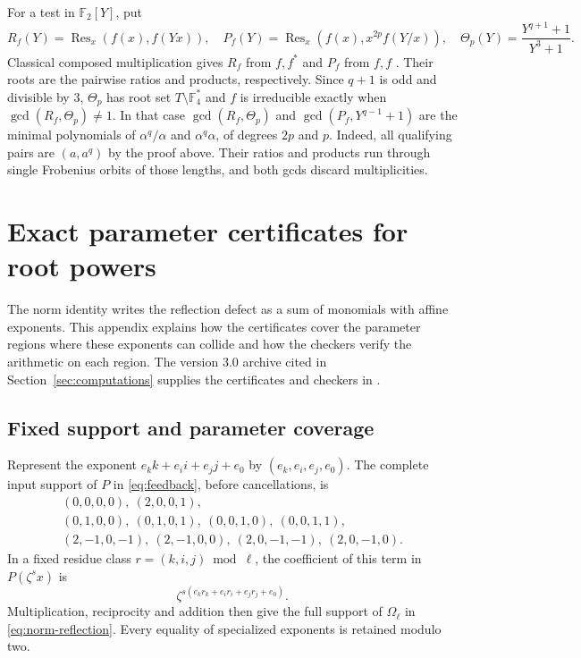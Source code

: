 \documentclass[11pt]{article}
\theoremstyle{definition}
\theoremstyle{remark}
\begin{document}
For a test in $\mathbb F_2[Y]$, put
\[
 R_f(Y)=\operatorname{Res}_x(f(x),f(Yx)),\quad
 P_f(Y)=\operatorname{Res}_x(f(x),x^{2p}f(Y/x)),\quad
 \Theta_p(Y)=\frac{Y^{q+1}+1}{Y^3+1}.
\]
Classical composed multiplication gives $R_f$ from $f,f^*$ and $P_f$
from $f,f$ \cite{BC87,BFSS06}. Their roots are the pairwise ratios and
products, respectively. Since $q+1$ is odd and divisible by $3$,
$\Theta_p$ has root set $T\setminus\mathbb F_4^*$ and $f$ is
irreducible exactly when $\gcd(R_f,\Theta_p)\ne1$. In that case
$\gcd(R_f,\Theta_p)$ and $\gcd(P_f,Y^{q-1}+1)$ are the minimal
polynomials of $\alpha^q/\alpha$ and $\alpha^q\alpha$, of degrees
$2p$ and $p$. Indeed, all qualifying pairs are $(a,a^q)$ by the
proof above. Their ratios and products run through single Frobenius
orbits of those lengths, and both gcds discard multiplicities.

\section{Exact parameter certificates for root powers}
\label{sec:root-certificates}
The norm identity writes the reflection defect as a sum of monomials
with affine exponents. This appendix explains how the certificates
cover the parameter regions where these exponents can collide and
how the checkers verify the arithmetic on each region. The version
3.0 archive cited in Section~\ref{sec:computations} supplies the
certificates and checkers in .

\subsection{Fixed support and parameter coverage}
Represent the exponent $e_k k+e_i i+e_j j+e_0$ by
$(e_k,e_i,e_j,e_0)$. The complete input support of $P$ in
\eqref{eq:feedback}, before cancellations, is
\begin{equation}\label{eq:feedback-support}
\begin{gathered}
 (0,0,0,0),\ (2,0,0,1),\\
 (0,1,0,0),\ (0,1,0,1),\
 (0,0,1,0),\ (0,0,1,1),\\
 (2,-1,0,-1),\ (2,-1,0,0),\
 (2,0,-1,-1),\ (2,0,-1,0).
\end{gathered}
\end{equation}
In a fixed residue class $r=(k,i,j)\bmod\ell$, the coefficient
of this term in $P(\zeta^s x)$ is
\[
 \zeta^{s(e_k r_k+e_i r_i+e_j r_j+e_0)} .
\]
Multiplication, reciprocity and addition then give the full support
of $\Omega_\ell$ in \eqref{eq:norm-reflection}.
Every equality of specialized exponents is retained modulo two.
\end{document}
